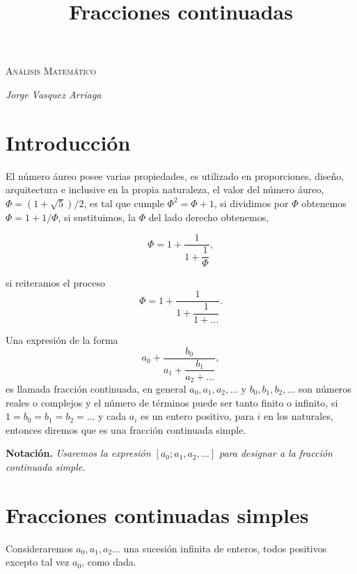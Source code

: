 \documentclass[11pt, article]{article}
\title{Fracciones continuadas}
\author{}
\date{}
\begin{document}
    \begin{center}
    {\scshape\LARGE Análisis Matemático \par}

    \vspace{0.5cm}
     
 
    \large{\itshape{Jorge Vasquez Arriaga}} \\

    
    \end{center}


\section*{Introducción}
    El número áureo posee varias propiedades, es utilizado en proporciones, diseño, arquitectura e inclusive en la propia naturaleza, el valor del número áureo, $\Phi=(1 + \sqrt{5})/2$, es tal que  cumple $\Phi^2=\Phi + 1$, si dividimos por $\Phi$ obtenemos $\Phi=1+1/\Phi$, si sustituimos, la $\Phi$ del lado derecho obtenemos, 
    
    \[\Phi = 1 + \dfrac{1}{1 + \dfrac{1}{\Phi}},\]

    si reiteramos el proceso 
    \[
        \Phi=1+\dfrac{1}{1+\dfrac{1}{1+\dots}}.
    \]
    
    Una expresión de la forma 
    \[
        a_0 + \dfrac{b_0}{a_1+ \dfrac{b_1}{a_2+\dots}},
    \]
    es llamada fracción continuada, en general $a_0, a_1,a_2,...$ y $b_0, b_1,b_2,...$ son números reales o complejos y el número de términos puede ser tanto finito o infinito, si $1=b_0=b_1=b_2=...$ y cada $a_i$ es un entero positivo, para $i$ en los naturales, entonces diremos que es una fracción continuada simple.
    
    \textbf{Notación.} \textit{Usaremos la expresión $[a_0;a_1,a_2, \dots]$ para designar a la fracción continuada simple.}
    
\section*{Fracciones continuadas simples}
    Consideraremos $a_0,a_1,a_2...$ una sucesión infinita de enteros, todos positivos excepto tal vez $a_0$, como dada.
    
\end{document}
